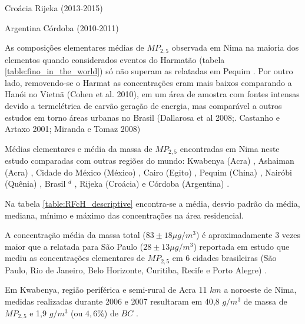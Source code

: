 Croácia Rijeka (2013-2015) \citep{ivovsevic2015}

Argentina Córdoba (2010-2011) \citep{achad2014}

As composições elementares médias de $MP_{2,5}$ observada em Nima na maioria 
dos elementos quando considerados eventos do Harmatão 
(tabela \ref{table:fino_in_the_world}) só não superam as relatadas
em Pequim \citep{yang2011}. Por outro lado, removendo-se o Harmat as concentrações eram mais baixos
comparando a Hanói no Vietnã (Cohen et al. 2010), em um
área de amostra com fontes intensas devido a termelétrica de carvão
geração de energia, mas comparável a outros estudos em torno
áreas urbanas no Brasil (Dallarosa et al 2008;. Castanho e
Artaxo 2001; Miranda e Tomaz 2008)


\begin{landscape}
  \begin{table}[H]
    \centering
    
    \caption{Médias elementares e média da massa de $MP_{2,5}$ encontradas
             em Nima neste estudo comparadas com outras regiões do mundo:
             Kwabenya (Acra) \citep{aboh2009},
             Ashaiman (Acra) \citep{ofosu2012},
             Cidade do México (México) \citep{diaz2014},
             Cairo (Egito) \citep{boman2013},
             Pequim (China) \citep{yang2011},
             Nairóbi (Quênia)  \citep{gaita2014},
             Brasil $^d$ \citep{andrade2012urban},
             Rijeka (Croácia) \citep{ivovsevic2015} e
             Córdoba (Argentina) \citep{achad2014}.
             \label{table:fino_in_the_world}}
  \end{table} 
\end{landscape}

Na tabela \ref{table:RFcH_descriptive} encontra-se a média, desvio padrão da média, 
mediana, mínimo e máximo das concentrações na área residencial. 

A concentração média da massa total ($83\pm 18 \mu g / m^3$) é aproximadamente
3 vezes maior que a relatada para São Paulo ($28\pm 13 \mu g / m^3$) reportada 
em estudo que mediu as concentrações elementares de $MP_{2,5}$ em 6 cidades 
brasileiras (São Paulo, Rio de Janeiro, Belo Horizonte, Curitiba, Recife e 
Porto Alegre) \cite{andrade2012}. 

Em Kwabenya, região periférica e semi-rural de Acra 11 $km$ a noroeste de Nima, 
medidas realizadas durante 2006 e 2007 resultaram em 40,8 $g / m^3$ de massa de 
$MP_{2,5}$ e 1,9 $g / m^3$ (ou $4,6\%$) de $BC$ \citep{aboh2009}.

